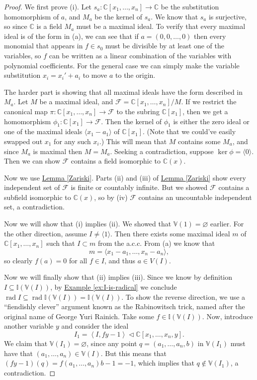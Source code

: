 \documentclass[letterpaper]{article}
\theoremstyle{definition}
\theoremstyle{remark}
\newcommand\CC{\mathbb{C}}
\newcommand\VV{\mathbb{V}}
\newcommand\II{\mathbb{I}}
\newcommand{\ideal}{\vartriangleleft}
\newcommand{\abrackets}[1]{\left\langle#1\right\rangle}
\DeclareMathOperator{\rad}{rad}
\begin{document}
\begin{proof}
    We first prove (i). Let \(s_a:\CC[x_1,\dots,x_n]\to \CC\) be the substitution homomorphism of \(a\), and \(M_a\) be the kernel of \(s_a\). We know that \(s_a\) is surjective, so since \(\CC{}\) is a field \(M_a\) must be a maximal ideal. To verify that every maximal ideal is of the form in (a), we can see that if \(a=(0,0,\dots,0)\) then every monomial that appears in \(f\in s_0\) must be divisible by at least one of the variables, so \(f\) can be written as a linear combination of the variables with polynomial coefficients. For the general case we can simply make the variable substitution \(x_i=x_i'+a_i\) to move \(a\) to the origin. 
		
	The harder part is showing that all maximal ideals have the form described in \(M_a\). Let \(M\) be a maximal ideal, and \(\mathcal F=\CC[x_1,\dots,x_n]/M\). If we restrict the canonical map \(\pi:\CC[x_1,\dots,x_n]\to \mathcal F\) to the subring \(\CC[x_1]\), then we get a homomorphism \(\phi_1:\CC[x_1]\to\mathcal F\). Then the kernel of \(\phi_1\) is either the zero ideal or one of the maximal ideals \(\langle x_1-a_1\rangle\) of \(\CC[x_1]\). (Note that we could've easily swapped out \(x_1\) for any such \(x_i\).) This will mean that \(M\) contains some \(M_a\), and since \(M_a\) is maximal then \(M=M_a\). Seeking a contradiction, suppose \(\ker\phi=\langle 0\rangle\). Then we can show \(\mathcal F\) contains a field isomorphic to \(\CC(x)\). 
	
	Now we use \hyperref[Zariski]{Lemma \ref*{Zariski}}. Parts (ii) and (iii) of \hyperref[Zariski]{Lemma \ref*{Zariski}} show every independent set of \(\mathcal F\) is finite or countably infinite. But we showed \(\mathcal F\) contains a subfield isomorphic to \(\CC(x)\), so by (iv) \(\mathcal F\) contains an uncountable independent set, a contradiction. 
		
	Now we will show that (i) implies (ii). We showed that \(\VV(1)=\varnothing\) earlier. For the other direction, assume \(I\neq \langle 1\rangle\). Then there exists some maximal ideal \(m\) of \(\CC[x_1,\dots,x_n]\) such that \(I\subset m\) from the a.c.c. From (a) we know that \[m=\langle x_1-a_1,\dots,x_n-a_n\rangle,\] so clearly \(f(a)=0\) for all \(f\in I\), and thus \(a\in V(I)\). 

	Now we will finally show that (ii) implies (iii). Since we know by definition \(I\subseteq\II(\VV(I))\), by \hyperref[ex:I-is-radical]{Example \ref*{ex:I-is-radical}} we conclude \(\rad I\subseteq \rad \II(\VV(I))=\II(\VV(I))\). To show the reverse direction, we use a ``fiendishly clever'' argument known as the Rabinowitsch trick, named after the original name of George Yuri Rainich. Take some \(f\in\II(\VV(I))\). Now, introduce another variable \(y\) and consider the ideal \[I_1=\abrackets{I,fy-1}\ideal\CC[x_1,\dots,x_n,y].\] We claim that \(\VV(I_1)=\varnothing\), since any point \(q=(a_1,\dots,a_n,b)\) in \(\VV(I_1)\) must have that \((a_1,\dots,a_n)\in \VV(I)\). But this means that \((fy-1)(q)=f(a_1,\dots,a_n)b-1=-1\), which implies that \(q\not\in\VV(I_1)\), a contradiction. 


\end{proof}
\end{document}
